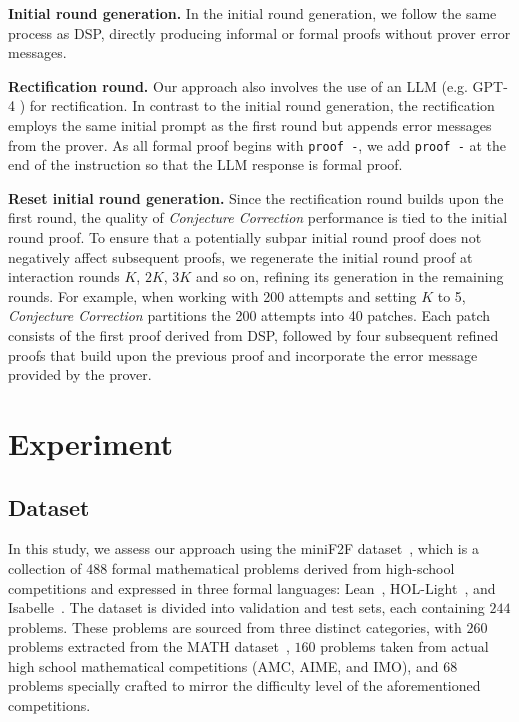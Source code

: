 \documentclass{article} \usepackage{iclr2024_conference,times}
\def\methodTwoFull{\textit{Conjecture Correction}\xspace}
\begin{document}
\textbf{Initial round generation.}  In the initial round generation, we follow the same process as DSP, directly producing informal or formal proofs without prover error messages.

\textbf{Rectification round.} Our approach also involves the use of an LLM (e.g. GPT-4 \citep{bubeck2023sparks}) for rectification. In contrast to the initial round generation, the rectification employs the same initial prompt as the first round but appends error messages from the prover. As all formal proof begins with \texttt{proof -}, we add \texttt{proof -} at the end of the instruction so that the LLM response is formal proof.

\textbf{Reset initial round generation.} Since the rectification round builds upon the first round, the quality of \methodTwoFull performance is tied to the initial round proof. To ensure that a potentially subpar initial round proof does not negatively affect subsequent proofs, we regenerate the initial round proof at interaction rounds $K$, $2K$, $3K$ and so on, refining its generation in the remaining rounds.  For example, when working with 200 attempts and setting $K$ to 5, \methodTwoFull partitions the 200 attempts into 40 patches. Each patch consists of the first proof derived from DSP, followed by four subsequent refined proofs that build upon the previous proof and incorporate the error message provided by the prover.


\section{Experiment}
\subsection{Dataset}
In this study, we assess our approach using the miniF2F dataset~\citep{zheng2021minif2f}, which is a collection of $488$ formal mathematical problems derived from high-school competitions and expressed in three formal languages: Lean~\citep{de2015lean}, HOL-Light~\citep{bansal2019holist}, and Isabelle~\citep{paulson1994isabelle}. The dataset is divided into validation and test sets, each containing $244$ problems. These problems are sourced from three distinct categories, with $260$ problems extracted from the MATH dataset~\citep{hendrycks2021measuring}, $160$ problems taken from actual high school mathematical competitions (AMC, AIME, and IMO), and $68$ problems specially crafted to mirror the difficulty level of the aforementioned competitions.
\end{document}
